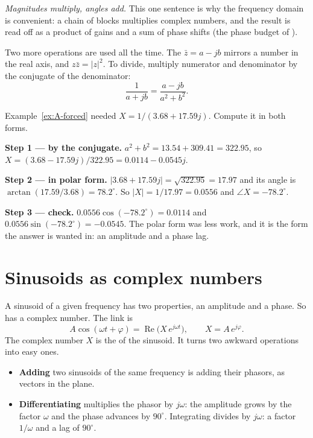 \emph{Magnitudes multiply, angles add.} This one sentence is why the frequency domain is convenient: a chain of blocks multiplies complex numbers, and the result is read off as a product of gains and a sum of phase shifts (the phase budget of ).

Two more operations are used all the time. The  $\bar z = a - jb$ mirrors a number in the real axis, and $z\bar z = |z|^2$. To divide, multiply numerator and denominator by the conjugate of the denominator:
\begin{equation}\label{eq:C-divide}
  \frac{1}{a + jb} = \frac{a - jb}{a^2 + b^2} .
\end{equation}

\begin{example}
\label{ex:C-divide}
Example~\ref{ex:A-forced} needed $X = 1/(3.68 + 17.59j)$. Compute it in both forms.

\textbf{Step 1 — by the conjugate.} $a^2 + b^2 = 13.54 + 309.41 = 322.95$, so $X = (3.68 - 17.59j)/322.95 = 0.0114 - 0.0545j$.

\textbf{Step 2 — in polar form.} $|3.68 + 17.59j| = \sqrt{322.95} = 17.97$ and its angle is $\arctan(17.59/3.68) = 78.2^\circ$. So $|X| = 1/17.97 = 0.0556$ and $\angle X = -78.2^\circ$.

\textbf{Step 3 — check.} $0.0556\cos(-78.2^\circ) = 0.0114$ and $0.0556\sin(-78.2^\circ) = -0.0545$. The polar form was less work, and it is the form the answer is wanted in: an amplitude and a phase lag.
\end{example}

\section{Sinusoids as complex numbers}

A sinusoid of a given frequency has two properties, an amplitude and a phase. So has a complex number. The link is
\begin{equation}\label{eq:C-phasor}
  A\cos(\omega t + \varphi) = \operatorname{Re}\big(X\,e^{j\omega t}\big), \qquad X = A\,e^{j\varphi} .
\end{equation}
The complex number $X$ is the  of the sinusoid. It turns two awkward operations into easy ones.
\begin{itemize}
  \item \textbf{Adding} two sinusoids of the same frequency is adding their phasors, as vectors in the plane.
  \item \textbf{Differentiating} multiplies the phasor by $j\omega$: the amplitude grows by the factor $\omega$ and the phase advances by $90^\circ$. Integrating divides by $j\omega$: a factor $1/\omega$ and a lag of $90^\circ$.
\end{itemize}

